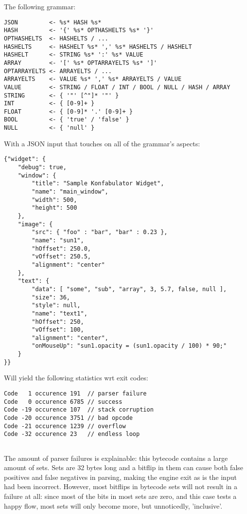 The following grammar:

\begin{myquote}
\begin{verbatim}
JSON         <- %s* HASH %s*
HASH         <- '{' %s* OPTHASHELTS %s* '}'
OPTHASHELTS  <- HASHELTS / ...
HASHELTS     <- HASHELT %s* ',' %s* HASHELTS / HASHELT
HASHELT      <- STRING %s* ':' %s* VALUE
ARRAY        <- '[' %s* OPTARRAYELTS %s* ']'
OPTARRAYELTS <- ARRAYELTS / ...
ARRAYELTS    <- VALUE %s* ',' %s* ARRAYELTS / VALUE
VALUE        <- STRING / FLOAT / INT / BOOL / NULL / HASH / ARRAY
STRING       <- { '"' [^"]* '"' }
INT          <- { [0-9]+ }
FLOAT        <- { [0-9]* '.' [0-9]+ }
BOOL         <- { 'true' / 'false' }
NULL         <- { 'null' }

\end{verbatim}
\end{myquote}

With a JSON input that touches on all of the grammar's aspects:

\begin{myquote}
\begin{verbatim}
{"widget": {
    "debug": true,
    "window": {
        "title": "Sample Konfabulator Widget",
        "name": "main_window",
        "width": 500,
        "height": 500
    },
    "image": {
        "src": { "foo" : "bar", "bar" : 0.23 },
        "name": "sun1",
        "hOffset": 250.0,
        "vOffset": 250.5,
        "alignment": "center"
    },
    "text": {
        "data": [ "some", "sub", "array", 3, 5.7, false, null ],
        "size": 36,
        "style": null,
        "name": "text1",
        "hOffset": 250,
        "vOffset": 100,
        "alignment": "center",
        "onMouseUp": "sun1.opacity = (sun1.opacity / 100) * 90;"
    }
}}

\end{verbatim}
\end{myquote}

Will yield the following statistics wrt exit codes:

\begin{myquote}
\begin{verbatim}
Code   1 occurence 191  // parser failure
Code   0 occurence 6785 // success
Code -19 occurence 107  // stack corruption
Code -20 occurence 3751 // bad opcode
Code -21 occurence 1239 // overflow
Code -32 occurence 23   // endless loop


\end{verbatim}
\end{myquote}

The amount of parser failures is explainable: this bytecode contains
a large amount of sets. Sets are 32 bytes long and a bitflip in them
can cause both false positives and false negatives in parsing, making
the engine exit as is the input had been incorrect. However, most bitflips
in bytecode sets will not result in a failure at all: since most of the
bits in most sets are zero, and this case tests a happy flow, most sets
will only become more, but unnoticedly, 'inclusive'.
